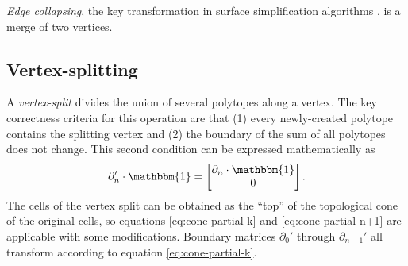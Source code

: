 \documentclass[twocolumn,leqno,twocolumn]{article}
\begin{document}
\emph{Edge collapsing}, the key transformation in surface simplification algorithms \cite{gueziec1995surface}, is a merge of two vertices.

\subsection{Vertex-splitting}

A \emph{vertex-split} divides the union of several polytopes along a vertex.
The key correctness criteria for this operation are that (1) every newly-created polytope contains the splitting vertex and (2) the boundary of the sum of all polytopes does not change.
This second condition can be expressed mathematically as
\begin{equation}
    \partial_n'\cdot\mathbbm{1} = \left[\begin{matrix}\partial_n\cdot\mathbbm{1} \\ 0\end{matrix}\right].
    \label{eq:split-preserves-boundaries}
\end{equation}
The cells of the vertex split can be obtained as the ``top'' of the topological cone of the original cells, so equations \eqref{eq:cone-partial-k} and \eqref{eq:cone-partial-n+1} are applicable with some modifications.
Boundary matrices $\partial_0'$ through $\partial_{n - 1}'$ all transform according to equation \eqref{eq:cone-partial-k}.
\end{document}
